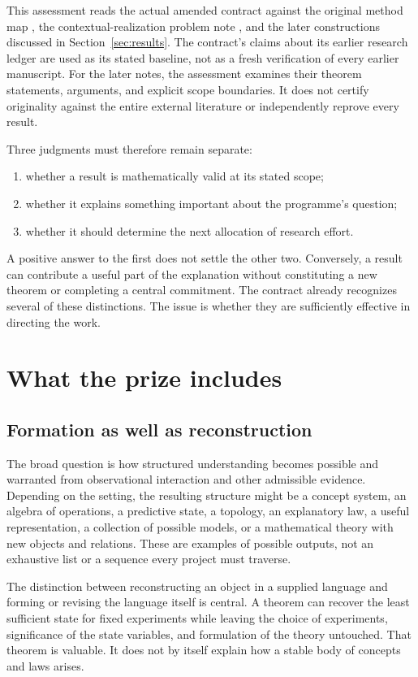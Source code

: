 \documentclass[11pt]{article}
\begin{document}
This assessment reads the actual amended contract \cite{Contract} against the original method map \cite{Map}, the contextual-realization problem note \cite{ProblemNote}, and the later constructions discussed in Section~\ref{sec:results}. The contract's claims about its earlier research ledger are used as its stated baseline, not as a fresh verification of every earlier manuscript. For the later notes, the assessment examines their theorem statements, arguments, and explicit scope boundaries. It does not certify originality against the entire external literature or independently reprove every result.

Three judgments must therefore remain separate:
\begin{enumerate}
\item whether a result is mathematically valid at its stated scope;
\item whether it explains something important about the programme's question;
\item whether it should determine the next allocation of research effort.
\end{enumerate}
A positive answer to the first does not settle the other two. Conversely, a result can contribute a useful part of the explanation without constituting a new theorem or completing a central commitment. The contract already recognizes several of these distinctions. The issue is whether they are sufficiently effective in directing the work.

\section{What the prize includes}
\label{sec:prize}

\subsection{Formation as well as reconstruction}

The broad question is how structured understanding becomes possible and warranted from observational interaction and other admissible evidence. Depending on the setting, the resulting structure might be a concept system, an algebra of operations, a predictive state, a topology, an explanatory law, a useful representation, a collection of possible models, or a mathematical theory with new objects and relations. These are examples of possible outputs, not an exhaustive list or a sequence every project must traverse.

The distinction between reconstructing an object in a supplied language and forming or revising the language itself is central. A theorem can recover the least sufficient state for fixed experiments while leaving the choice of experiments, significance of the state variables, and formulation of the theory untouched. That theorem is valuable. It does not by itself explain how a stable body of concepts and laws arises.
\end{document}
